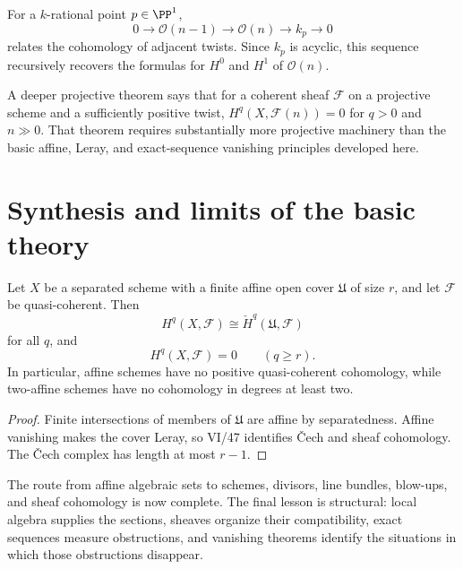 \begin{corollary}\label{cor:vi49-p1-point}
For a $k$-rational point $p\in\PP^1$,
\[
0\to\mathcal O(n-1)\to\mathcal O(n)\to k_p\to0
\]
relates the cohomology of adjacent twists. Since $k_p$ is acyclic, this sequence recursively recovers the formulas for $H^0$ and $H^1$ of $\mathcal O(n)$.
\end{corollary}

\begin{remark}\label{remark:vi49-serre-preview}
A deeper projective theorem says that for a coherent sheaf $\mathcal F$ on a projective scheme and a sufficiently positive twist, $H^q(X,\mathcal F(n))=0$ for $q>0$ and $n\gg0$. That theorem requires substantially more projective machinery than the basic affine, Leray, and exact-sequence vanishing principles developed here.
\end{remark}

\section{Synthesis and limits of the basic theory}

\begin{theorem}\label{thm:vi49-part-ix-synthesis}
Let $X$ be a separated scheme with a finite affine open cover $\mathfrak U$ of size $r$, and let $\mathcal F$ be quasi-coherent. Then
\[
H^q(X,\mathcal F)\cong\check H^q(\mathfrak U,\mathcal F)
\]
for all $q$, and
\[
H^q(X,\mathcal F)=0\qquad(q\ge r).
\]
In particular, affine schemes have no positive quasi-coherent cohomology, while two-affine schemes have no cohomology in degrees at least two.
\begin{proof}
Finite intersections of members of $\mathfrak U$ are affine by separatedness. Affine vanishing makes the cover Leray, so VI/47 identifies Čech and sheaf cohomology. The Čech complex has length at most $r-1$.
\end{proof}
\end{theorem}

\begin{remark}\label{remark:vi49-volume-close}
The route from affine algebraic sets to schemes, divisors, line bundles, blow-ups, and sheaf cohomology is now complete. The final lesson is structural: local algebra supplies the sections, sheaves organize their compatibility, exact sequences measure obstructions, and vanishing theorems identify the situations in which those obstructions disappear.
\end{remark}


